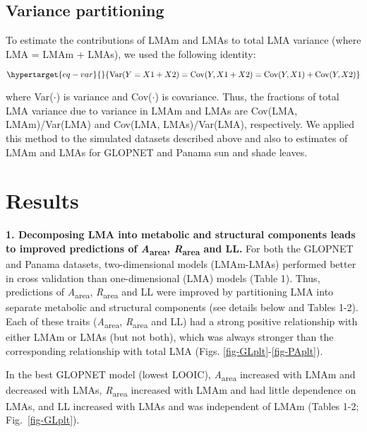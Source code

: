 \documentclass[
  12pt,
  a4paper,
,tablecaptionabove
]{scrartcl}
\begin{document}
\hypertarget{variance-partitioning}{%
\subsection{Variance partitioning}\label{variance-partitioning}}

To estimate the contributions of LMAm and LMAs to total LMA variance
(where LMA = LMAm + LMAs), we used the following identity:

\begin{equation}\protect\hypertarget{eq-var}{}{
\mathrm{Var}(Y = X1 + X2) = \mathrm{Cov}(Y, X1+X2) = \mathrm{Cov}(Y,X1) + \mathrm{Cov}(Y,X2)
}\label{eq-var}\end{equation}

where Var(\(\cdot\)) is variance and Cov(\(\cdot\)) is covariance. Thus,
the fractions of total LMA variance due to variance in LMAm and LMAs are
Cov(LMA, LMAm)/Var(LMA) and Cov(LMA, LMAs)/Var(LMA), respectively. We
applied this method to the simulated datasets described above and also
to estimates of LMAm and LMAs for GLOPNET and Panama sun and shade
leaves.

\hypertarget{results}{%
\section{Results}\label{results}}

\textbf{1. Decomposing LMA into metabolic and structural components
leads to improved predictions of \emph{A}\textsubscript{area},
\emph{R}\textsubscript{area} and LL.} For both the GLOPNET and Panama
datasets, two-dimensional models (LMAm-LMAs) performed better in cross
validation than one-dimensional (LMA) models (Table 1). Thus,
predictions of \emph{A}\textsubscript{area},
\emph{R}\textsubscript{area} and LL were improved by partitioning LMA
into separate metabolic and structural components (see details below and
Tables 1-2). Each of these traits (\emph{A}\textsubscript{area},
\emph{R}\textsubscript{area} and LL) had a strong positive relationship
with either LMAm or LMAs (but not both), which was always stronger than
the corresponding relationship with total LMA (Figs.
\ref{fig-GLplt}-\ref{fig-PAplt}).

In the best GLOPNET model (lowest LOOIC), \emph{A}\textsubscript{area}
increased with LMAm and decreased with LMAs,
\emph{R}\textsubscript{area} increased with LMAm and had little
dependence on LMAs, and LL increased with LMAs and was independent of
LMAm (Tables 1-2; Fig.~\ref{fig-GLplt}).
\end{document}
